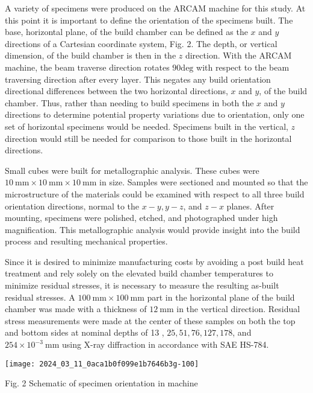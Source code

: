 \documentclass[10pt]{article}
\begin{document}
A variety of specimens were produced on the ARCAM machine for this study. At this point it is important to define the orientation of the specimens built. The base, horizontal plane, of the build chamber can be defined as the $x$ and $y$ directions of a Cartesian coordinate system, Fig. 2. The depth, or vertical dimension, of the build chamber is then in the $z$ direction. With the ARCAM machine, the beam traverse direction rotates $90 \mathrm{deg}$ with respect to the beam traversing direction after every layer. This negates any build orientation directional differences between the two horizontal directions, $x$ and $y$, of the build chamber. Thus, rather than needing to build specimens in both the $x$ and $y$ directions to determine potential property variations due to orientation, only one set of horizontal specimens would be needed. Specimens built in the vertical, $z$ direction would still be needed for comparison to those built in the horizontal directions.

Small cubes were built for metallographic analysis. These cubes were $10 \mathrm{~mm} \times 10 \mathrm{~mm} \times 10 \mathrm{~mm}$ in size. Samples were sectioned and mounted so that the microstructure of the materials could be examined with respect to all three build orientation directions, normal to the $x-y, y-z$, and $z-x$ planes. After mounting, specimens were polished, etched, and photographed under high magnification. This metallographic analysis would provide insight into the build process and resulting mechanical properties.

Since it is desired to minimize manufacturing costs by avoiding a post build heat treatment and rely solely on the elevated build chamber temperatures to minimize residual stresses, it is necessary to measure the resulting as-built residual stresses. A $100 \mathrm{~mm} \times 100 \mathrm{~mm}$ part in the horizontal plane of the build chamber was made with a thickness of $12 \mathrm{~mm}$ in the vertical direction. Residual stress measurements were made at the center of these samples on both the top and bottom sides at nominal depths of 13 , $25,51,76,127,178$, and $254 \times 10^{-3} \mathrm{~mm}$ using X-ray diffraction in accordance with SAE HS-784.

\begin{center}
\texttt{[image: 2024\_03\_11\_0aca1b0f099e1b7646b3g-100]}
\end{center}

Fig. 2 Schematic of specimen orientation in machine
\end{document}
